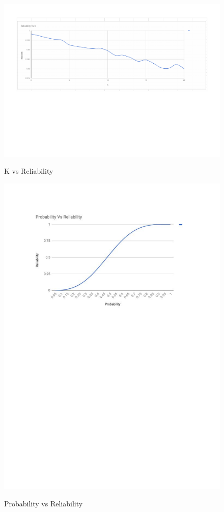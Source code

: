 \documentclass[11pt]{article}
\begin{document}
\begin{figure}
 \includegraphics[width=\linewidth]{ReliabilityvsProbability.pdf}
\label{fig: kvr}
\caption{K vs Reliability}
\end{figure}
\begin{figure}
  \includegraphics[width=\linewidth]{kvsreliability.pdf}
\label{fig: rvp}
\caption{Probability vs Reliability}
\end{figure}
\end{document}
